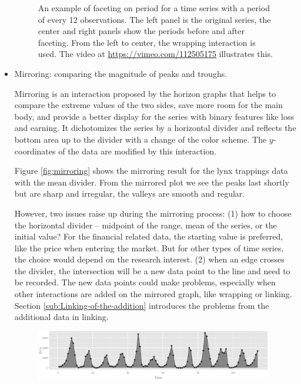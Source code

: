 \documentclass[12pt]{article}
\begin{document}
\begin{itemize}
\begin{center}
\begin{figure}[H]
\caption{\label{fig:faceting-period}An example of faceting on period for a
time series with a period of every 12 observations. The left panel
is the original series, the center and right panels show the periods
before and after faceting. From the left to center, the wrapping interaction
is used. The video at \url{https://vimeo.com/112505175} illustrates this.}
\end{figure}
\par\end{center}


\item Mirroring: comparing the magnitude of peaks and troughs.


Mirroring is an interaction proposed by the horizon graphs that helps
to compare the extreme values of the two sides, save more room for
the main body, and provide a better display for the series with binary
features like loss and earning. It dichotomizes the series by a horizontal
divider and reflects the bottom area up to the divider with a change
of the color scheme. The $y$-coordinates of the data are modified by
this interaction.


Figure \ref{fig:mirroring} shows the mirroring result for the lynx
trappings data with the mean divider. From the mirrored plot we see
the peaks last shortly but are sharp and irregular, the valleys are
smooth and regular.


However, two issues raise up during the mirroring process:  (1) how
to choose the horizontal divider -- midpoint of the range, mean of
the series, or the initial value? For the financial related data,
the starting value is preferred, like the price when entering the
market. But for other types of time series, the choice would depend
on the research interest.  (2) when an edge crosses the divider, the
intersection will be a new data point to the line and need to be recorded.
The new data points could make problems, especially when other interactions
are added on the mirrored graph, like wrapping or linking. Section
\ref{sub:Linking-of-the-addition} introduces the problems from the
additional data in linking.


\begin{center}
\begin{figure}[H]
\begin{centering}
\includegraphics[width=0.98\textwidth]{graph/pipeline-18-original}
\par\end{centering}


\end{figure}
\end{center}
\end{itemize}
\end{document}
